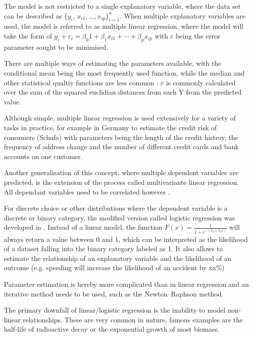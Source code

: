 The model is not restricted to a single explanatory variable, where the data set can be described as  ${\displaystyle \{y_{i},\,x_{i1},\ldots ,x_{ip}\}_{i=1}^{n}}$. When multiple explanatory variables are used, the model is referred to as multiple linear regression, where the model will take the form of ${ y_{i} +\varepsilon _{i} =\beta _{0}1+\beta _{1}x_{i1}+\cdots +\beta _{p}x_{ip}}$ with $\varepsilon$ being the error parameter sought to be minimised.

There are multiple ways of estimating the parameters available, with the conditional mean being the most frequently used function, while the median and other statistical qualtiy functions are less common \cite{Yan:2009:LRA:1717831}.  $\varepsilon$ is commonly calculated over the sum of the squared euclidian distances from each Y from the predicted value.


Although simple, multiple linear regression is used extensively for a variety of tasks in practice, for example in Germany to estimate the credit risk of consumers (Schufa) with parameters being the length of the credit histroy, the frequency of address change and the number of different credit cards and bank accounts on one customer. %


Another generalisation of this concept, where multiple dependent variables are predicted, is the extension of the process called multivariante linear regression. All dependant variables need to be correlated however \cite{Yan:2009:LRA:1717831}.


For discrete choice or other distributions where the dependent variable is a discrete or binary category, the modified version called logistic regression was developed in \cite{cox58reg}. Instead of a linear model, the  function ${\displaystyle F(x)={\frac {1}{1+e^{-(\beta _{0}+\beta _{1}x)}}}}$ will always return a value between 0 and 1, which can be interpreted as the likelihood of a dataset falling into the binary category labeled as 1. It also allows to estimate the relationship of an explanatory variable and the likelihood of an outcome (e.g. speeding will increase the likelihood of an accident by xx\%)

Parameter estimation is hereby more complicated than in linear regression and an iterative method needs to be used, such as the Newton–Raphson method.


The primary downfall of linear/logistic regression is the inability to model non-linear relationships. These are very common in nature, famous examples are the half-life of radioactive decay or the exponential growth of most biomass.


